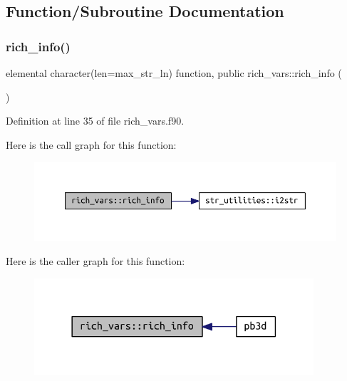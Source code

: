\subsection{Function/\+Subroutine Documentation}
\mbox{\label{namespacerich__vars_a4f54d3fc0ac510fc073220794ee4fa37}} 
\subsubsection{\texorpdfstring{rich\+\_\+info()}{rich\_info()}}
{\footnotesize\ttfamily elemental character(len=max\+\_\+str\+\_\+ln) function, public rich\+\_\+vars\+::rich\+\_\+info (\begin{DoxyParamCaption}{ }\end{DoxyParamCaption})}



Definition at line 35 of file rich\+\_\+vars.\+f90.

Here is the call graph for this function\+:
\nopagebreak
\begin{figure}[H]
\begin{center}
\leavevmode
\includegraphics[width=350pt]{namespacerich__vars_a4f54d3fc0ac510fc073220794ee4fa37_cgraph}
\end{center}
\end{figure}
Here is the caller graph for this function\+:
\nopagebreak
\begin{figure}[H]
\begin{center}
\leavevmode
\includegraphics[width=294pt]{namespacerich__vars_a4f54d3fc0ac510fc073220794ee4fa37_icgraph}
\end{center}
\end{figure}


